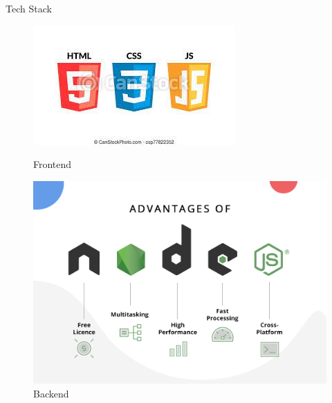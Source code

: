 \documentclass{beamer}
\begin{document}
\begin{frame}{Tech Stack}
    \begin{figure}
        \begin{minipage}[t]{0.2\textwidth}
            \centering
            \includegraphics[width=\textwidth]{frontend.jpeg}
            \caption{Frontend}
        \end{minipage}\hfill
        \begin{minipage}[t]{0.2\textwidth}
            \centering
            \includegraphics[width=\textwidth]{node.js_backend.png}
            \caption{Backend}
        \end{minipage}\hfill
        \begin{minipage}[t]{0.2\textwidth}
            \centering

\end{minipage}
\end{figure}
\end{frame}
\end{document}
